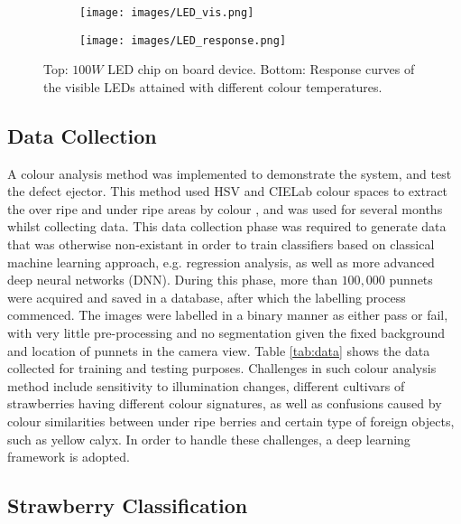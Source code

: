 \documentclass[conference]{IEEEtran}
\begin{document}
\begin{figure}[ht]
	\centering
	\begin{subfigure}{.45\textwidth}
		\centering
		\texttt{[image: images/LED\_vis.png]}
		\caption{}
		\label{fig:LED_vis}
	\end{subfigure}%
	
	\begin{subfigure}{.45\textwidth}
		\centering
		\texttt{[image: images/LED\_response.png]}
		\caption{}
		\label{fig:LED_response}
	\end{subfigure}%
	
	\caption{Top: $100W$ LED chip on board device. Bottom: Response curves of the visible LEDs attained with different colour temperatures. }
	\label{fig:LED}
\end{figure}


\subsection{Data Collection}

A colour analysis method was implemented to demonstrate the system, and test the defect ejector. This method used HSV and CIELab colour spaces to extract the over ripe and under ripe areas by colour \cite{eaton2}, and was used for several months whilst collecting data. This data collection phase was required to generate data that was otherwise non-existant in order to train classifiers based on classical machine learning approach, e.g. regression analysis, as well as more advanced deep neural networks (DNN). During this phase, more than $100,000$ punnets were acquired and saved in a database, after which the labelling process commenced. The images were labelled in a binary manner as either pass or fail, with very little pre-processing and no segmentation given the fixed background and location of punnets in the camera view. Table \ref{tab:data} shows the data collected for training and testing purposes. Challenges in such colour analysis method include sensitivity to illumination changes, different cultivars of strawberries having different colour signatures, as well as confusions caused by colour similarities between under ripe berries and certain type of foreign objects, such as yellow calyx. In order to handle these challenges, a deep learning framework is adopted.




\subsection{Strawberry Classification}
\label{sec:strawberry_classification}
\end{document}
